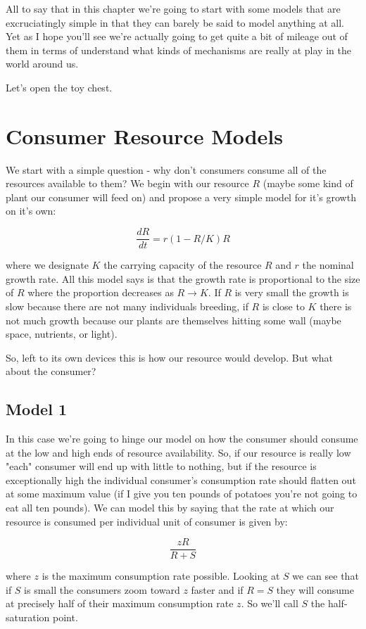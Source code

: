 \documentclass[11pt,a5paper]{book}
\begin{document}
All to say that in this chapter we're going to start with some models that are excruciatingly simple in that they can barely be said to model anything at all. Yet as I hope you'll see we're actually going to get quite a bit of mileage out of them in terms of understand what kinds of mechanisms are really at play in the world around us. 
\newline

Let's open the toy chest. 

\section{Consumer Resource Models}

We start with a simple question - why don't consumers consume all of the resources available to them? We begin with our resource $R$ (maybe some kind of plant our consumer will feed on) and propose a very simple model for it's growth on it's own:

$$\frac{dR}{dt} = r(1-R/K)R$$

where we designate $K$ the carrying capacity of the resource $R$ and $r$ the nominal growth rate. All this model says is that the growth rate is proportional to the size of $R$ where the proportion decreases as $R\rightarrow K$. If $R$ is very small the growth is slow because there are not many individuals breeding, if $R$ is close to $K$ there is not much growth because our plants are themselves hitting some wall (maybe space, nutrients, or light). 

So, left to its own devices this is how our resource would develop. But what about the consumer?

\subsection{Model 1}

In this case we're going to hinge our model on how the consumer should consume at the low and high ends of resource availability. So, if our resource is really low "each" consumer will end up with little to nothing, but if the resource is exceptionally high the individual consumer's consumption rate should flatten out at some maximum value (if I give you ten pounds of potatoes you're not going to eat all ten pounds). We can model this by saying that the rate at which our resource is consumed per individual unit of consumer is given by:

$$\frac{zR}{R+S}$$

where $z$ is the maximum consumption rate possible. Looking at $S$ we can see that if $S$ is small the consumers zoom toward $z$ faster and if $R=S$ they will consume at precisely half of their maximum consumption rate $z$. So we'll call $S$ the half-saturation point. 
\end{document}
